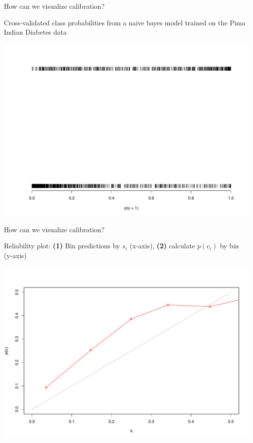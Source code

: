 \documentclass[ignorenonframetext,]{beamer}
\begin{document}
\begin{frame}{How can we visualize calibration?}

Cross-validated class probabilities from a naive bayes model trained on
the Pima Indian Diabetes data

\footnotesize
\includegraphics{presentation_files/figure-beamer/unnamed-chunk-1-1.pdf}

\end{frame}

\begin{frame}{How can we visualize calibration?}

Reliability plot: \textbf{(1)} Bin predictions by \(s_i\) (x-axis),
\textbf{(2)} calculate \(p(c_i)\) by bin (y-axis)

\includegraphics{presentation_files/figure-beamer/unnamed-chunk-2-1.pdf}

\end{frame}
\end{document}
